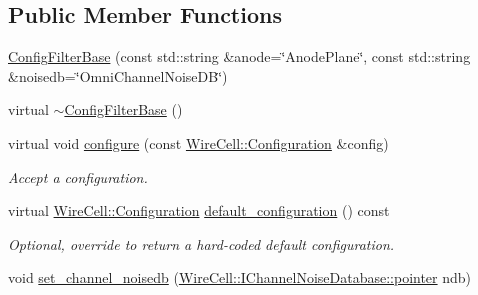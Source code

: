 \subsection*{Public Member Functions}
\begin{DoxyCompactItemize}
\item 
\hyperlink{class_wire_cell_1_1_sig_proc_1_1_protodune_1_1_config_filter_base_ac4e78e426df5a24a4b8638597f0ab6d1}{Config\+Filter\+Base} (const std\+::string \&anode=\char`\"{}Anode\+Plane\char`\"{}, const std\+::string \&noisedb=\char`\"{}Omni\+Channel\+Noise\+DB\char`\"{})
\item 
virtual \hyperlink{class_wire_cell_1_1_sig_proc_1_1_protodune_1_1_config_filter_base_a35b2519db55618d3bc2b167bc3964404}{$\sim$\+Config\+Filter\+Base} ()
\item 
virtual void \hyperlink{class_wire_cell_1_1_sig_proc_1_1_protodune_1_1_config_filter_base_a70292e077d8a9a578494a64e9f9afa6a}{configure} (const \hyperlink{namespace_wire_cell_a9f705541fc1d46c608b3d32c182333ee}{Wire\+Cell\+::\+Configuration} \&config)
\begin{DoxyCompactList}\small\item\em Accept a configuration. \end{DoxyCompactList}\item 
virtual \hyperlink{namespace_wire_cell_a9f705541fc1d46c608b3d32c182333ee}{Wire\+Cell\+::\+Configuration} \hyperlink{class_wire_cell_1_1_sig_proc_1_1_protodune_1_1_config_filter_base_a68b71c244f3a6ade0320a43f1699f1c9}{default\+\_\+configuration} () const
\begin{DoxyCompactList}\small\item\em Optional, override to return a hard-\/coded default configuration. \end{DoxyCompactList}\item 
void \hyperlink{class_wire_cell_1_1_sig_proc_1_1_protodune_1_1_config_filter_base_a4a6d78e4e3977165a24420463bc32526}{set\+\_\+channel\+\_\+noisedb} (\hyperlink{class_wire_cell_1_1_interface_a09c548fb8266cfa39afb2e74a4615c37}{Wire\+Cell\+::\+I\+Channel\+Noise\+Database\+::pointer} ndb)
\end{DoxyCompactItemize}
